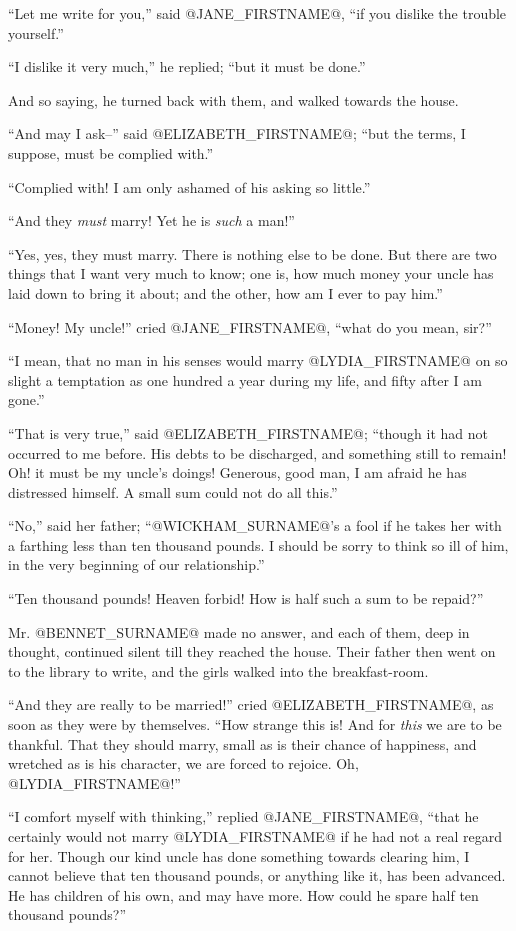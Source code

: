 ``Let me write for you,'' said @JANE_FIRSTNAME@, ``if you dislike the trouble
yourself.''

``I dislike it very much,'' he replied; ``but it must be done.''

And so saying, he turned back with them, and walked towards the house.

``And may I ask--'' said @ELIZABETH_FIRSTNAME@; ``but the terms, I suppose, must be
complied with.''

``Complied with! I am only ashamed of his asking so little.''

``And they \textit{must} marry! Yet he is \textit{such} a man!''

``Yes, yes, they must marry. There is nothing else to be done. But there
are two things that I want very much to know; one is, how much money
your uncle has laid down to bring it about; and the other, how am I ever
to pay him.''

``Money! My uncle!'' cried @JANE_FIRSTNAME@, ``what do you mean, sir?''

``I mean, that no man in his senses would marry @LYDIA_FIRSTNAME@ on so slight a
temptation as one hundred a year during my life, and fifty after I am
gone.''

``That is very true,'' said @ELIZABETH_FIRSTNAME@; ``though it had not occurred to me
before. His debts to be discharged, and something still to remain! Oh!
it must be my uncle's doings! Generous, good man, I am afraid he has
distressed himself. A small sum could not do all this.''

``No,'' said her father; ``@WICKHAM_SURNAME@'s a fool if he takes her with a farthing
less than ten thousand pounds. I should be sorry to think so ill of him,
in the very beginning of our relationship.''

``Ten thousand pounds! Heaven forbid! How is half such a sum to be
repaid?''

Mr. @BENNET_SURNAME@ made no answer, and each of them, deep in thought, continued
silent till they reached the house. Their father then went on to the
library to write, and the girls walked into the breakfast-room.

``And they are really to be married!'' cried @ELIZABETH_FIRSTNAME@, as soon as they
were by themselves. ``How strange this is! And for \textit{this} we are to be
thankful. That they should marry, small as is their chance of happiness,
and wretched as is his character, we are forced to rejoice. Oh, @LYDIA_FIRSTNAME@!''

``I comfort myself with thinking,'' replied @JANE_FIRSTNAME@, ``that he certainly would
not marry @LYDIA_FIRSTNAME@ if he had not a real regard for her. Though our kind
uncle has done something towards clearing him, I cannot believe that ten
thousand pounds, or anything like it, has been advanced. He has children
of his own, and may have more. How could he spare half ten thousand
pounds?''

